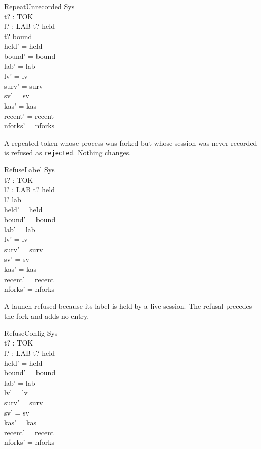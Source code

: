 \documentclass[a4paper,10pt,fleqn]{article}
\begin{document}
\begin{schema}{RepeatUnrecorded}
  \Delta Sys \\
  t? : TOK \\ l? : LAB
\where
  t? \in \dom held \\
  t? \notin bound \\
  held' = held \\
  bound' = bound \\
  lab' = lab \\
  lv' = lv \\
  surv' = surv \\
  sv' = sv \\
  kas' = kas \\
  recent' = recent \\
  nforks' = nforks
\end{schema}

A repeated token whose process was forked but whose session was never recorded is refused as \texttt{rejected}. Nothing changes.

\begin{schema}{RefuseLabel}
  \Delta Sys \\
  t? : TOK \\ l? : LAB
\where
  t? \notin \dom held \\
  l? \in \dom lab \\
  held' = held \\
  bound' = bound \\
  lab' = lab \\
  lv' = lv \\
  surv' = surv \\
  sv' = sv \\
  kas' = kas \\
  recent' = recent \\
  nforks' = nforks
\end{schema}

A launch refused because its label is held by a live session. The refusal precedes the fork and adds no entry.

\begin{schema}{RefuseConfig}
  \Delta Sys \\
  t? : TOK \\ l? : LAB
\where
  t? \notin \dom held \\
  held' = held \\
  bound' = bound \\
  lab' = lab \\
  lv' = lv \\
  surv' = surv \\
  sv' = sv \\
  kas' = kas \\
  recent' = recent \\
  nforks' = nforks
\end{schema}
\end{document}
